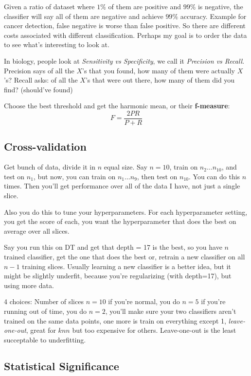 Given a ratio of dataset where $1\%$ of them are positive and $99\%$
is negative, the classifier will say all of them are negative and
achieve $99\%$ accuracy.
Example for cancer detection, false negative is worse than false positive.
So there are different costs associated with different classification.
Perhaps my goal is to order the data to see what's interesting to look
at.

In biology, people look at \emph{Sensitivity vs Specificity}, we call
it \emph{Precision vs Recall}.
Precision says of all the $X$’s that you found, how many of them were
actually $X$’s? Recall asks: of all the $X$’s that were out there, how many
of them did you find? (should've found)

Choose the best threshold and get the harmonic mean, or their
\textbf{f-measure}:
$$F = \frac{2PR}{P+R}$$

\subsection{Cross-validation}
\label{sec:crossvalidation}

Get bunch of data, divide it in $n$ equal size. Say $n=10$, train on
$n_2\dots n_{10}$, and test on $n_1$, but now, you can train on $n_1
\dots n_9$, then test on $n_{10}$. You can do this $n$ times. Then
you'll get performance over all of the data I have, not just a single
slice.

Also you do this to tune your hyperparameters. For each hyperparameter
setting, you get the score of each, you want the hyperparameter that
does the best on average over all slices.

Say you run this on DT and get that depth = 17 is the best, so you
have $n$ trained classifier, get the one that does the best or,
retrain a new classifier on all $n-1$ training slices.
Usually learning a new classifier is a better idea, but it might be
slightly underfit, because you're regularizing (with depth=17), but
using more data.

4 choices: Number of slices $n=10$ if you're normal, you do $n=5$ if you're
running out of time, you do $n=2$, you'll make sure your two
classifiers aren't trained on the same data points, one more is train on everything except 1,
\emph{leave-one-out}, great for $knn$ but too expensive for others.
Leave-one-out is the least succeptable to underfitting.

\subsection{Statistical Significance}
\label{sec:statisticalsignificance}

